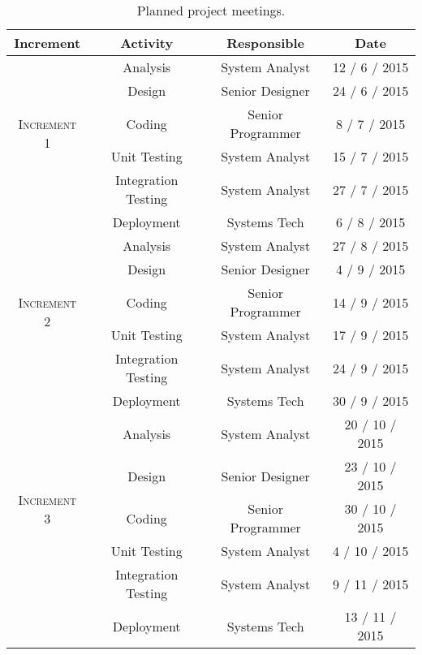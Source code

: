 \begin{table}[hbtp]
\centering
\begin{tabular}{|c|c|c|c|}
\hline
\textbf{Increment} & \textbf{Activity} & \textbf{Responsible} & \textbf{Date} \\ \hline \hline

\multirow{5}{*}{\textsc{Increment 1}} & Analysis & System Analyst & 12 / 6 / 2015 \\ \cline{2-4}
 & Design & Senior Designer & 24 / 6 / 2015 \\ \cline{2-4}
 & Coding & Senior Programmer & 8 / 7 / 2015 \\ \cline{2-4}
 & Unit Testing & System Analyst & 15 / 7 / 2015 \\ \cline{2-4}
 & Integration Testing & System Analyst & 27 / 7 / 2015 \\ \cline{2-4}
 & Deployment & Systems Tech & 6 / 8 / 2015 \\ \hline \hline

\multirow{5}{*}{\textsc{Increment 2}} & Analysis & System Analyst & 27 / 8 / 2015 \\ \cline{2-4}
 & Design & Senior Designer & 4 / 9 / 2015 \\ \cline{2-4}
 & Coding & Senior Programmer & 14 / 9 / 2015 \\ \cline{2-4}
 & Unit Testing & System Analyst & 17 / 9 / 2015 \\ \cline{2-4}
 & Integration Testing & System Analyst & 24 / 9 / 2015 \\ \cline{2-4}
 & Deployment & Systems Tech & 30 / 9 / 2015 \\ \hline \hline

\multirow{5}{*}{\textsc{Increment 3}} & Analysis & System Analyst & 20 / 10 / 2015 \\ \cline{2-4}
 & Design & Senior Designer & 23 / 10 / 2015 \\ \cline{2-4}
 & Coding & Senior Programmer & 30 / 10 / 2015 \\ \cline{2-4}
 & Unit Testing & System Analyst & 4 / 10 / 2015 \\ \cline{2-4}
 & Integration Testing & System Analyst & 9 / 11 / 2015 \\ \cline{2-4}
 & Deployment & Systems Tech & 13 / 11 / 2015 \\ \hline

\end{tabular}
\caption{Planned project meetings.}
\label{tblPlannedMeetings}
\end{table}

